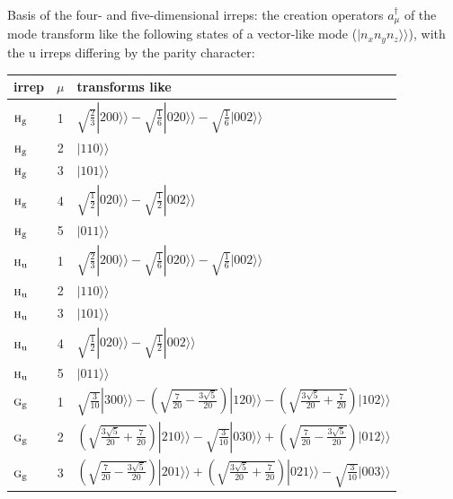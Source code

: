 \documentclass[11pt]{article}
\newcommand{\irr}[1]{\text{\normalfont\scshape #1}}
\newcommand{\ptag}[1]{\mathrm{#1}}
\newcommand{\kett}[1]{|#1\rangle\!\rangle}
\begin{document}
Basis of the four- and five-dimensional irreps: the creation operators $a^\dagger_\mu$ of the mode transform like the following states of a vector-like mode ($\kett{n_xn_yn_z}$), with the $\ptag{u}$ irreps differing by the parity character:

\begin{longtable}{l c p{}}\hline irrep & $\mu$ & transforms like\\ \hline\endhead

$\irr{h}_{\ptag{g}}$ & 1 & $\sqrt{\tfrac{2}{3}}\kett{200}-\sqrt{\tfrac{1}{6}}\kett{020}-\sqrt{\tfrac{1}{6}}\kett{002}$\\

$\irr{h}_{\ptag{g}}$ & 2 & $\kett{110}$\\

$\irr{h}_{\ptag{g}}$ & 3 & $\kett{101}$\\

$\irr{h}_{\ptag{g}}$ & 4 & $\sqrt{\tfrac{1}{2}}\kett{020}-\sqrt{\tfrac{1}{2}}\kett{002}$\\

$\irr{h}_{\ptag{g}}$ & 5 & $\kett{011}$\\

$\irr{h}_{\ptag{u}}$ & 1 & $\sqrt{\tfrac{2}{3}}\kett{200}-\sqrt{\tfrac{1}{6}}\kett{020}-\sqrt{\tfrac{1}{6}}\kett{002}$\\

$\irr{h}_{\ptag{u}}$ & 2 & $\kett{110}$\\

$\irr{h}_{\ptag{u}}$ & 3 & $\kett{101}$\\

$\irr{h}_{\ptag{u}}$ & 4 & $\sqrt{\tfrac{1}{2}}\kett{020}-\sqrt{\tfrac{1}{2}}\kett{002}$\\

$\irr{h}_{\ptag{u}}$ & 5 & $\kett{011}$\\

$\irr{g}_{\ptag{g}}$ & 1 & $\sqrt{\tfrac{3}{10}}\kett{300}-(\sqrt{\frac{7}{20} - \frac{3 \sqrt{5}}{20}})\kett{120}-(\sqrt{\frac{3 \sqrt{5}}{20} + \frac{7}{20}})\kett{102}$\\

$\irr{g}_{\ptag{g}}$ & 2 & $(\sqrt{\frac{3 \sqrt{5}}{20} + \frac{7}{20}})\kett{210}-\sqrt{\tfrac{3}{10}}\kett{030}+(\sqrt{\frac{7}{20} - \frac{3 \sqrt{5}}{20}})\kett{012}$\\

$\irr{g}_{\ptag{g}}$ & 3 & $(\sqrt{\frac{7}{20} - \frac{3 \sqrt{5}}{20}})\kett{201}+(\sqrt{\frac{3 \sqrt{5}}{20} + \frac{7}{20}})\kett{021}-\sqrt{\tfrac{3}{10}}\kett{003}$\\


\end{longtable}
\end{document}
